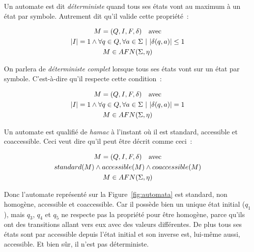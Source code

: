 \begin{definition}
    Un automate est dit \textit{déterministe} quand tous ses états vont au
    maximum à un état par symbole. Autrement dit qu'il valide cette propriété~:

    \begin{gather*}
        M = (Q, I, F, \delta) \quad \text{avec} \\
        |I| = 1 \land \forall q \in Q, \forall a \in \Sigma ~|~ | \delta(q, a) | \leq 1\\
        M \in AFN(\Sigma, \eta) \notag
    \end{gather*}

    On parlera de \textit{déterministe complet} lorsque tous ses états vont sur un
    état par symbole. C'est-à-dire qu'il respecte cette condition~:

    \begin{gather*}
        M = (Q, I, F, \delta) \quad \text{avec} \\
        |I| = 1 \land \forall q \in Q, \forall a \in \Sigma ~|~ | \delta(q, a) | = 1\\
        M \in AFN(\Sigma, \eta) \notag
    \end{gather*}
\end{definition}

\begin{lemma}
    Un automate est qualifié de \textit{hamac} à l'instant où il est standard,
    accessible et coaccessible. Ceci veut dire qu'il peut être décrit comme
    ceci~:

    \begin{gather*}
        M = (Q, I, F, \delta) \quad \text{avec} \\
        standard(M) \land accessible(M) \land coaccessible(M) \\
        M \in AFN(\Sigma, \eta) \notag
    \end{gather*}
\end{lemma}

\vphantom{}

Donc l'automate représenté sur la Figure~\ref{fig:automata} est standard, non
homogène, accessible et coaccessible. Car il possède bien un unique état
initial (\(q_1\)), mais \(q_3\), \(q_4\) et \(q_5\) ne respecte pas la
propriété pour être homogène, parce qu'ils ont des transitions allant vers eux
avec des valeurs différentes. De plus tous ses états sont par accessible depuis
l'état initial et son inverse est, lui-même aussi, accessible. Et bien sûr, il
n'est pas déterministe.

